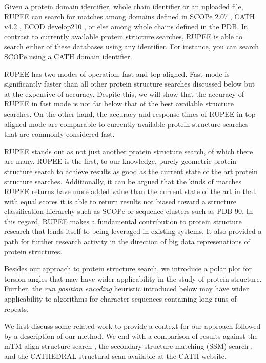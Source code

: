 \documentclass[letter,center,fleqn]{NAR}
\begin{document}
Given a protein domain identifier, whole chain identifier or an uploaded file, RUPEE can search for matches among domains defined in SCOPe 2.07 \cite{Fox2013}, CATH v4.2 \cite{Orengo1997}, ECOD develop210 \cite{Cheng2014}, or else among whole chains defined in the PDB.
In contrast to currently available protein structure searches, RUPEE is able to search either of these databases using any identifier. 
For instance, you can search SCOPe using a CATH domain identifier. 

RUPEE has two modes of operation, fast and top-aligned. 
Fast mode is significantly faster than all other protein structure searches discussed below but at the expensive of accuracy.
Despite this, we will show that the accuracy of RUPEE in fast mode is not far below that of the best available structure searches. 
On the other hand, the accuracy and response times of RUPEE in top-aligned mode are comparable to currently available protein structure searches that are commonly considered fast. 

RUPEE stands out as not just another protein structure search, of which there are many. 
RUPEE is the first, to our knowledge, purely geometric protein structure search to achieve results as good as the current state of the art protein structure searches. 
Additionally, it can be argued that the kinds of matches RUPEE returns have more added value than the current state of the art in that with equal scores it is able to return results not biased toward a structure classification hierarchy such as SCOPe or sequence clusters such as PDB-90. 
In this regard, RUPEE makes a fundamental contribution to protein structure research that lends itself to being leveraged in existing systems. 
It also provided a path for further research activity in the direction of big data represenations of protein structures. 

Besides our approach to protein structure search, we introduce a polar plot for torsion angles that may have wider applicability in the study of protein structure. 
Further, the \emph{run position encoding} heuristic introduced below may have wider applicability to algorithms for character sequences containing long runs of repeats. 

We first discuss some related work to provide a context for our approach followed by a description of our method. 
We end with a comparison of results against the mTM-align structure search \cite{Dong2018}, the secondary structure matching (SSM) search \cite{Krissinel2004}, and the CATHEDRAL structural scan \cite{Redfern2007} available at the CATH website.
\end{document}
